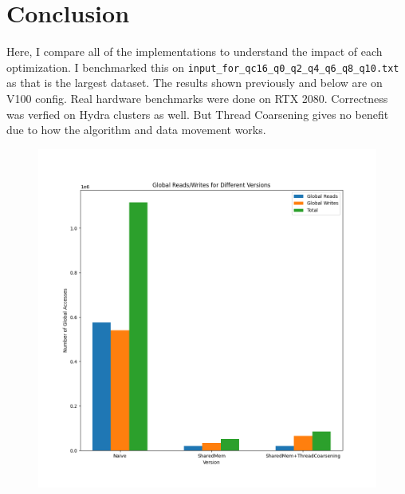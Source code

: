 \documentclass{article}
\begin{document}
\section{Conclusion}
Here, I compare all of the implementations to understand the impact of each optimization. I benchmarked this on \verb|input_for_qc16_q0_q2_q4_q6_q8_q10.txt| as that is the largest dataset. The results shown previously and below are on V100 config. Real hardware benchmarks were done on RTX 2080. Correctness was verfied on Hydra clusters as well. But Thread Coarsening gives no benefit due to how the algorithm and data movement works.

\begin{figure}[H]
	\centerline{\includegraphics[width=6in]{figures/global_reads_writes.png}}
\end{figure}
\end{document}
